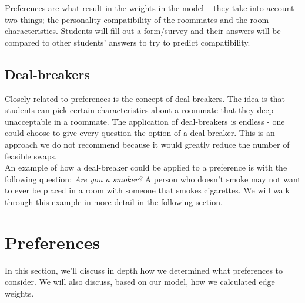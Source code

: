 \documentclass[12pt]{article}
\begin{document}
\noindent Preferences are what result in the weights in the model – they take into account two things; the personality compatibility of the roommates and the room characteristics. Students will fill out a form/survey and their answers will be compared to other students’ answers to try to predict compatibility. 

\subsection{Deal-breakers} 
Closely related to preferences is the concept of deal-breakers. The idea is that students can pick certain characteristics about a roommate that they deep unacceptable in a roommate. The application of deal-breakers is endless - one could choose to give every question the option of a deal-breaker. This is an approach we do not recommend because it would greatly reduce the number of feasible swaps. \\

An example of how a deal-breaker could be applied to a preference is with the following question: \textit{Are you a smoker?} A person who doesn't smoke may not want to ever be placed in a room with someone that smokes cigarettes. We will walk through this example in more detail in the following section.

\section{Preferences}
In this section, we'll discuss in depth how we determined what preferences to consider. We will also discuss, based on our model, how we calculated edge weights. 
\end{document}
